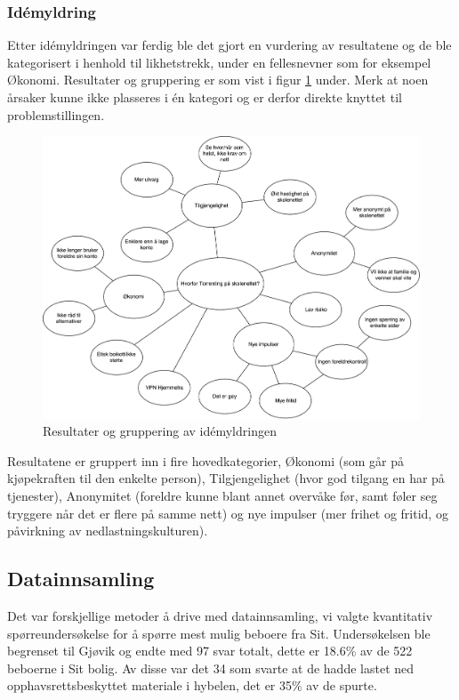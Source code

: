 \subsubsection{Idémyldring}
Etter idémyldringen var ferdig ble det gjort en vurdering av resultatene og de ble kategorisert i henhold til likhetstrekk, under en fellesnevner som for eksempel Økonomi. Resultater og gruppering er som vist i figur \ref{fig:idemyldring} under. Merk at noen årsaker kunne ikke plasseres i én kategori og er derfor direkte knyttet til problemstillingen. 

\begin{figure}[H]
    \centering    \includegraphics[scale=0.45]{case_1/bilder/idemyldring}
    \caption[Idémyldring]{Resultater og gruppering av idémyldringen}
    \label{fig:idemyldring}
\end{figure}

Resultatene er gruppert inn i fire hovedkategorier, Økonomi (som går på kjøpekraften til den enkelte person), Tilgjengelighet (hvor god tilgang en har på tjenester), Anonymitet (foreldre kunne blant annet overvåke før, samt føler seg tryggere når det er flere på samme nett) og nye impulser (mer frihet og fritid, og påvirkning av nedlastningskulturen).


\subsection{Datainnsamling}
Det var forskjellige metoder å drive med datainnsamling, vi valgte kvantitativ spørreundersøkelse for å spørre mest mulig beboere fra Sit. Undersøkelsen ble begrenset til Gjøvik og endte med 97 svar totalt, dette er 18.6\% av de 522 beboerne i Sit bolig. Av disse var det 34 som svarte at de hadde lastet ned opphavsrettsbeskyttet materiale i hybelen, det er 35\% av de spurte. 

